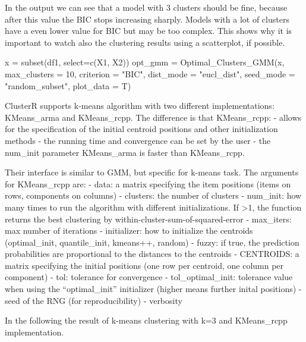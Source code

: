 \documentclass[
]{article}
\newenvironment{Shaded}{\begin{snugshade}}{\end{snugshade}}
\newcommand{\AttributeTok}[1]{\textcolor[rgb]{0.77,0.63,0.00}{#1}}
\newcommand{\DecValTok}[1]{\textcolor[rgb]{0.00,0.00,0.81}{#1}}
\newcommand{\FunctionTok}[1]{\textcolor[rgb]{0.00,0.00,0.00}{#1}}
\newcommand{\NormalTok}[1]{#1}
\newcommand{\OtherTok}[1]{\textcolor[rgb]{0.56,0.35,0.01}{#1}}
\newcommand{\StringTok}[1]{\textcolor[rgb]{0.31,0.60,0.02}{#1}}
\begin{document}
In the output we can see that a model with 3 clusters should be fine,
because after this value the BIC stops increasing sharply. Models with a
lot of clusters have a even lower value for BIC but may be too complex.
This shows why it is important to watch also the clustering results
using a scatterplot, if possible.

\begin{Shaded}
\begin{Highlighting}[]
\NormalTok{x }\OtherTok{=} \FunctionTok{subset}\NormalTok{(df1, }\AttributeTok{select=}\FunctionTok{c}\NormalTok{(X1, X2))}
\NormalTok{opt\_gmm }\OtherTok{=} \FunctionTok{Optimal\_Clusters\_GMM}\NormalTok{(x, }\AttributeTok{max\_clusters =} \DecValTok{10}\NormalTok{, }\AttributeTok{criterion =} \StringTok{"BIC"}\NormalTok{, }
                               \AttributeTok{dist\_mode =} \StringTok{"eucl\_dist"}\NormalTok{, }\AttributeTok{seed\_mode =} \StringTok{"random\_subset"}\NormalTok{,}
                               \AttributeTok{plot\_data =}\NormalTok{ T)      }
\end{Highlighting}
\end{Shaded}

ClusterR supports k-means algorithm with two different implementations:
KMeans\_arma and KMeans\_rcpp. The difference is that KMeans\_rcpp: -
allows for the specification of the initial centroid positions and other
initialization methods - the running time and convergence can be set by
the user - the num\_init parameter KMeans\_arma is faster than
KMeans\_rcpp.

Their interface is similar to GMM, but specific for k-means task. The
arguments for KMeans\_rcpp are: - data: a matrix specifying the item
positions (items on rows, components on columns) - clusters: the number
of clusters - num\_init: how many times to run the algorithm with
different initializations. If \textgreater1, the function returns the
best clustering by within-cluster-sum-of-squared-error - max\_iters: max
number of iterations - initializer: how to initialize the centroids
(optimal\_init, quantile\_init, kmeans++, random) - fuzzy: if true, the
prediction probabilities are proportional to the distances to the
centroids - CENTROIDS: a matrix specifying the initial positions (one
row per centroid, one column per component) - tol: tolerance for
convergence - tol\_optimal\_init: tolerance value when using the
``optimal\_init'' initializer (higher means further inital positions) -
seed of the RNG (for reproducibility) - verbosity

In the following the result of k-means clustering with k=3 and
KMeans\_rcpp implementation.
\end{document}

